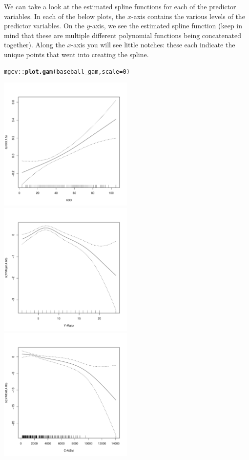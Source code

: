 \documentclass{article}\usepackage[]{graphicx}\usepackage[]{color}
\makeatletter
\newcommand{\hlnum}[1]{\textcolor[rgb]{0.686,0.059,0.569}{#1}}%
\newcommand{\hlopt}[1]{\textcolor[rgb]{0,0,0}{#1}}%
\newcommand{\hlstd}[1]{\textcolor[rgb]{0.345,0.345,0.345}{#1}}%
\newcommand{\hlkwc}[1]{\textcolor[rgb]{0.333,0.667,0.333}{#1}}%
\newcommand{\hlkwd}[1]{\textcolor[rgb]{0.737,0.353,0.396}{\textbf{#1}}}%
\newenvironment{kframe}{%
 \def\at@end@of@kframe{}%
 \ifinner\ifhmode%
  \def\at@end@of@kframe{\end{minipage}}%
  \begin{minipage}{\columnwidth}%
 \fi\fi%
 \def\FrameCommand##1{\hskip\@totalleftmargin \hskip-\fboxsep
 \colorbox{shadecolor}{##1}\hskip-\fboxsep
     \hskip-\linewidth \hskip-\@totalleftmargin \hskip\columnwidth}%
 \MakeFramed {\advance\hsize-\width
   \@totalleftmargin\z@ \linewidth\hsize
   \@setminipage}}%
 {\par\unskip\endMakeFramed%
 \at@end@of@kframe}
\newenvironment{knitrout}{}{} %
\makeatother
\begin{document}
We can take a look at the estimated spline functions for each of the predictor variables. In each of the below plots, the $x$-axis contains the various levels of the predictor variables. On the $y$-axis, we see the estimated spline function (keep in mind that these are multiple different polynomial functions being concatenated together). Along the $x$-axis you will see little notches: these each indicate the unique points that went into creating the spline.

\begin{knitrout}
\color{fgcolor}\begin{kframe}
\begin{alltt}
\hlstd{mgcv}\hlopt{::}\hlkwd{plot.gam}\hlstd{(baseball_gam,} \hlkwc{scale} \hlstd{=} \hlnum{0}\hlstd{)}
\end{alltt}
\end{kframe}
\includegraphics[width=0.50\textwidth]{figure/unnamed-chunk-3-1} 
\includegraphics[width=0.50\textwidth]{figure/unnamed-chunk-3-2} 
\includegraphics[width=0.50\textwidth]{figure/unnamed-chunk-3-3} 

\end{knitrout}
\end{document}
